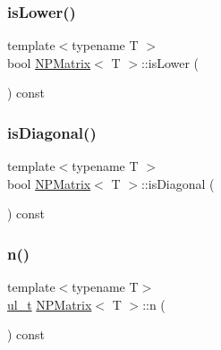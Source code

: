 \mbox{\label{class_n_p_matrix_a6844661ffc6253ad10c104e0069a0a09}} 
\subsubsection{\texorpdfstring{isLower()}{isLower()}}
{\footnotesize\ttfamily template$<$typename T $>$ \\
bool \mbox{\hyperlink{class_n_p_matrix}{N\+P\+Matrix}}$<$ T $>$\+::is\+Lower (\begin{DoxyParamCaption}{ }\end{DoxyParamCaption}) const}

\mbox{\label{class_n_p_matrix_aa6e1114bee7818455ee8c2e8bcd55679}} 
\subsubsection{\texorpdfstring{isDiagonal()}{isDiagonal()}}
{\footnotesize\ttfamily template$<$typename T $>$ \\
bool \mbox{\hyperlink{class_n_p_matrix}{N\+P\+Matrix}}$<$ T $>$\+::is\+Diagonal (\begin{DoxyParamCaption}{ }\end{DoxyParamCaption}) const}

\mbox{\label{class_n_p_matrix_afc181b7652d9427125c72c38d7c1498d}} 
\subsubsection{\texorpdfstring{n()}{n()}}
{\footnotesize\ttfamily template$<$typename T$>$ \\
\mbox{\hyperlink{group___n_algebra_ga1b140a2034db3f5dfe18a987745df43a}{ul\+\_\+t}} \mbox{\hyperlink{class_n_p_matrix}{N\+P\+Matrix}}$<$ T $>$\+::n (\begin{DoxyParamCaption}{ }\end{DoxyParamCaption}) const\hspace{0.3cm}{\ttfamily [inline]}}



